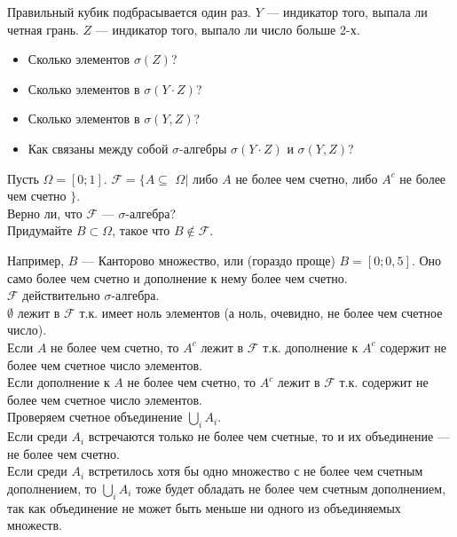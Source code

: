 \begin{problem}
 Правильный кубик подбрасывается один раз. $Y$ --- индикатор того, выпала ли четная грань. $Z$ --- индикатор того, выпало ли число больше 2-х. \\
\begin{itemize}
\item Сколько элементов $\sigma(Z)$? 
\item Сколько элементов в $\sigma(Y\cdot Z)$? 
\item Сколько элементов в $\sigma(Y,Z)$? 
\item Как связаны между собой $ \sigma $-алгебры $\sigma(Y\cdot Z)$ и $\sigma(Y,Z)$?
\end{itemize}

\end{problem} 
\begin{solution} 

\end{solution}

\begin{problem}
Пусть $\Omega=[0;1]$. $\mathcal{F}=\{A\subseteq$ $\Omega|$ либо $A$ не
более чем счетно, либо $A^{c}$ не более чем счетно $\}$. \\
Верно ли, что $\mathcal{F}$ --- $\sigma$-алгебра? \\
Придумайте $B\subset\Omega$, такое что $B \notin\mathcal{F}$. 
\end{problem} 
\begin{solution} 
Например, $B$ --- Канторово множество, или (гораздо проще)
$B=[0;0,5]$. Оно само более чем счетно и дополнение к нему более
чем счетно. \\
$\mathcal{F}$ действительно $\sigma$-алгебра. \\
$\emptyset$ лежит в $\mathcal{F}$ т.к. имеет ноль элементов (а ноль,
очевидно, не более чем счетное число). \\
Если $A$ не более чем счетно, то $A^{c}$ лежит в $\mathcal{F}$
т.к. дополнение к $A^{c}$ содержит не более чем счетное
число элементов. \\
Если дополнение к $A$ не более чем счетно, то $A^{c}$ лежит
в $\mathcal{F}$ т.к. содержит не более чем счетное число элементов. \\
Проверяем счетное объединение $\bigcup_{i} A_{i}$. \\
Если среди $A_{i}$ встречаются только не более чем счетные, то и
их объединение --- не более чем счетно. \\
Если среди $A_{i}$ встретилось хотя бы одно множество с не более
чем счетным дополнением, то $\bigcup_{i} A_{i}$ тоже будет
обладать не более чем счетным дополнением, так как объединение не
может быть меньше ни одного из объединяемых множеств. 
\end{solution}

